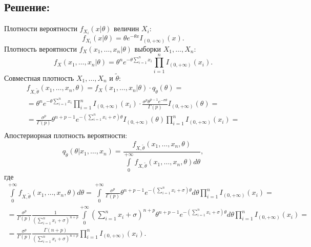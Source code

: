\documentclass[12pt]{article}
\begin{document}
    \subsection*{Решение:}
    Плотности вероятности $f_{X_i}(x | \theta)$ величин $X_i$:
    \[
        f_{X_i}(x | \theta) = \theta e^{- \theta x} I_{\left ( 0, + \infty\right )}(x) .
    \]
    Плотность вероятности $f_X(x_1, \dots, x_n | \theta)$ выборки $X_1, \dots, X_n$:
    \[
        f_X(x_1, \dots, x_n | \theta) = \theta^n e^{- \theta \sum_{i=1}^n x_i} \prod_{i=1}^n I_{\left ( 0, + \infty\right )}(x_i) .
    \]
    Совместная плотность $X_1, \dots, X_n$ и $\widetilde{\theta}$:
    \begin{multline*}
        f_{X,\widetilde{\theta}}(x_1, \dots, x_n, \theta)
        = f_X(x_1, \dots, x_n | \theta) \cdot q_{\widetilde{\theta}}(\theta) = \\
        = \theta^n e^{- \theta \sum_{i=1}^n x_i} \prod_{i=1}^n I_{\left ( 0, + \infty\right )}(x_i) \cdot \frac{\sigma^p \theta^{p-1} e^{-\sigma \theta}}{\Gamma(p)} I_{\left ( 0, + \infty\right )}(\theta) = \\
        = \frac{\sigma^p}{\Gamma(p)} \theta^{n+p-1} e^{- \left ( \sum_{i=1}^n x_i + \sigma \right ) \theta } I_{\left ( 0, + \infty\right )}(\theta) \prod_{i=1}^n I_{\left ( 0, + \infty\right )}(x_i) = \\
    \end{multline*}
    Апостериорная плотность вероятности:
    \[
        q_{\widetilde{\theta}}(\theta | x_1, \dots, x_n) = \frac{f_{X,\widetilde{\theta}}(x_1, \dots, x_n, \theta)}{\int \limits_0^{+ \infty} f_{X,\widetilde{\theta}}(x_1, \dots, x_n, \theta) d \theta} ,
    \]
    где
    \begin{multline*}
        \int \limits_0^{+ \infty} f_{X,\widetilde{\theta}}(x_1, \dots, x_n, \theta) d \theta
        = \int \limits_0^{+ \infty} \frac{\sigma^p}{\Gamma(p)} \theta^{n+p-1} e^{- \left ( \sum_{i=1}^n x_i + \sigma \right ) \theta } d \theta \prod_{i=1}^n I_{\left ( 0, + \infty\right )}(x_i) = \\
        = \frac{\sigma^p}{\Gamma(p)} \frac{1}{\left ( \sum_{i=1}^n x_i + \sigma \right )^{n+p}} \int \limits_0^{+ \infty} \left ( \sum_{i=1}^n x_i + \sigma \right )^{n+p} \theta^{n+p-1} e^{- \left ( \sum_{i=1}^n x_i + \sigma \right ) \theta } d \theta \prod_{i=1}^n I_{\left ( 0, + \infty\right )}(x_i) = \\
        = \frac{\sigma^p}{\Gamma(p)} \frac{\Gamma(n+p)}{\left ( \sum_{i=1}^n x_i + \sigma \right )^{n+p}} \prod_{i=1}^n I_{\left ( 0, + \infty\right )}(x_i) .
    \end{multline*}
\end{document}
